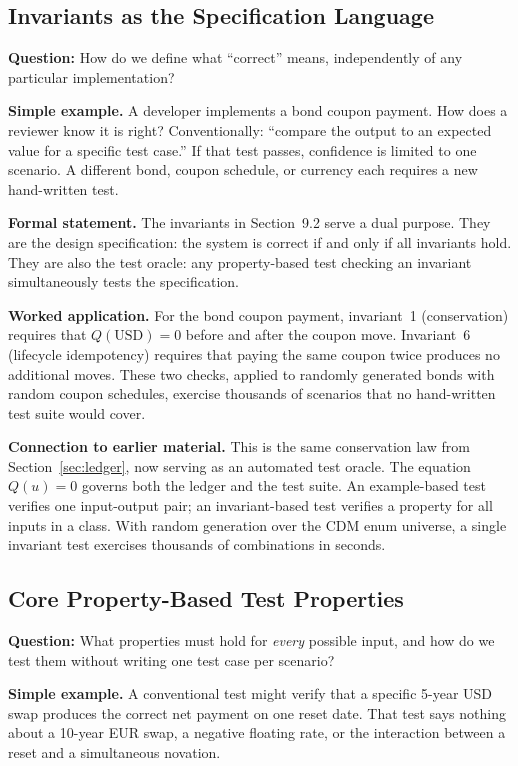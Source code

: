 \documentclass[11pt,a4paper]{article}
\begin{document}
\subsection{Invariants as the Specification Language}

\noindent\textbf{Question:} How do we define what ``correct'' means, independently of any particular implementation?

\noindent\textbf{Simple example.} A developer implements a bond coupon payment. How does a reviewer know it is right? Conventionally: ``compare the output to an expected value for a specific test case.'' If that test passes, confidence is limited to one scenario. A different bond, coupon schedule, or currency each requires a new hand-written test.

\noindent\textbf{Formal statement.} The invariants in Section~9.2 serve a dual purpose. They are the design specification: the system is correct if and only if all invariants hold. They are also the test oracle: any property-based test checking an invariant simultaneously tests the specification.

\noindent\textbf{Worked application.} For the bond coupon payment, invariant~1 (conservation) requires that $Q(\text{USD}) = 0$ before and after the coupon move. Invariant~6 (lifecycle idempotency) requires that paying the same coupon twice produces no additional moves. These two checks, applied to randomly generated bonds with random coupon schedules, exercise thousands of scenarios that no hand-written test suite would cover.

\noindent\textbf{Connection to earlier material.} This is the same conservation law from Section~\ref{sec:ledger}, now serving as an automated test oracle. The equation $Q(u) = 0$ governs both the ledger and the test suite. An example-based test verifies one input-output pair; an invariant-based test verifies a property for all inputs in a class. With random generation over the CDM enum universe, a single invariant test exercises thousands of combinations in seconds.

\subsection{Core Property-Based Test Properties}

\noindent\textbf{Question:} What properties must hold for \textit{every} possible input, and how do we test them without writing one test case per scenario?

\noindent\textbf{Simple example.} A conventional test might verify that a specific 5-year USD swap produces the correct net payment on one reset date. That test says nothing about a 10-year EUR swap, a negative floating rate, or the interaction between a reset and a simultaneous novation.
\end{document}
